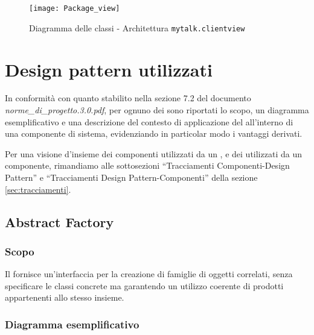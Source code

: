 \begin{figure}[H]
  \centering
  \texttt{[image: Package\_view]}
  \caption{Diagramma delle classi - Architettura \texttt{mytalk.clientview}}\label{fig:sottoarchview}
\end{figure}
\clearpage

\section{Design pattern utilizzati}
In conformità con quanto stabilito nella sezione 7.2 del documento \textit{norme\_di\_progetto.3.0.pdf}, per ognuno dei  sono riportati lo scopo, un diagramma esemplificativo e una descrizione del contesto di applicazione del  all'interno di una componente di sistema, evidenziando in particolar modo i vantaggi derivati.

Per una visione d'insieme dei componenti utilizzati da un , e dei  utilizzati da un componente, rimandiamo alle sottosezioni ``Tracciamenti Componenti-Design Pattern'' e ``Tracciamenti Design Pattern-Componenti'' della sezione \vref{sec:tracciamenti}.

\subsection{Abstract Factory}
\subsubsection{Scopo}
Il  fornisce un'interfaccia per la creazione di famiglie di oggetti correlati, senza specificare le classi concrete ma garantendo un utilizzo coerente di prodotti appartenenti allo stesso insieme.

\subsubsection{Diagramma esemplificativo}

